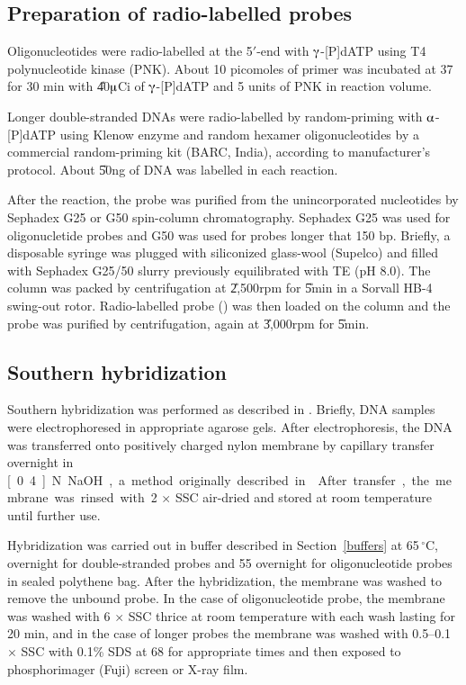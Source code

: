 \subsection{Preparation of radio-labelled probes}

Oligonucleotides were radio-labelled at the 5$'$-end with
$\gammaup$-[P]dATP using T4 polynucleotide kinase (PNK)\@.
About 10 picomoles of primer was incubated at 37\dg{} for 30 min
with \U{40}{$\muup$Ci} of $\gammaup$-[P]dATP and 5 units of
PNK in  reaction volume.

Longer double-stranded DNAs were radio-labelled by random-priming
with $\alphaup$-[P]dATP using Klenow enzyme and random
hexamer oligonucleotides by a commercial random-priming kit (BARC,
India), according to manufacturer's protocol. About \U{50}{ng} of
DNA was labelled in each reaction.

After the reaction, the probe was purified from the unincorporated
nucleotides by Sephadex G25 or G50 spin-column chromatography.
Sephadex G25 was used for oligonucletide probes and G50 was used
for probes longer that 150 bp. Briefly, a  disposable
syringe was plugged with siliconized glass-wool (Supelco) and
filled with Sephadex G25/50 slurry previously equilibrated with TE
(pH 8.0). The column was packed by centrifugation at
\U{2,500}{rpm} for \U{5}{min} in a Sorvall HB-4 swing-out rotor.
Radio-labelled probe () was then loaded on the column and
the probe was purified by centrifugation, again at \U{3,000}{rpm}
for \U{5}{min}.

\subsection{Southern hybridization}
\label{mat:southern}

Southern hybridization was performed as described in
\citet{Parry1995}. Briefly, DNA samples were electrophoresed in
appropriate agarose gels. After electrophoresis, the DNA was
transferred onto positively charged nylon membrane by capillary
transfer overnight in \unit[0.4]{N} NaOH, a method originally
described in \citet{Reed1985}. After transfer, the membrane was
rinsed with 2 $\times$ SSC air-dried and stored at room
temperature until further use.

Hybridization was carried out in buffer described in
Section~\ref{buffers} \citep{Church1984} at 65\,$^\circ$C,
overnight for double-stranded probes and 55\dg{} overnight for
oligonucleotide probes in sealed polythene bag. After the
hybridization, the membrane was washed to remove the unbound
probe. In the case of oligonucleotide probe, the membrane was
washed with 6 $\times$ SSC thrice at room temperature with each
wash lasting for 20 min, and in the case of longer probes the
membrane was washed with 0.5--0.1 $\times$ SSC with 0.1\% SDS at
68\dg{} for appropriate times and then exposed to phosphorimager
(Fuji) screen or X-ray film.

